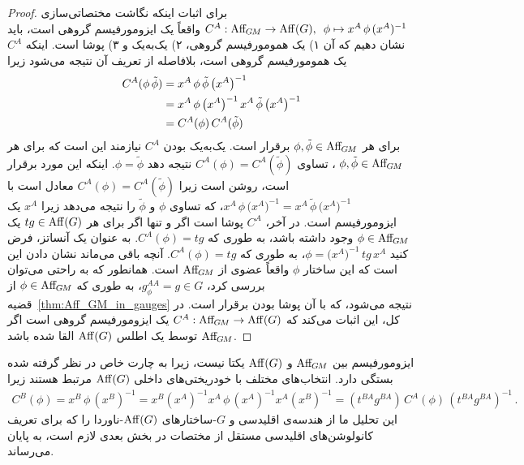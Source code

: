 \begin{proof}
	برای اثبات اینکه نگاشت مختصاتی‌سازی $C^A: \operatorname{Aff}_{\mkern-2muG\mkern-1.4muM} \to \operatorname{Aff}(G),\,\ \phi \mapsto x^A \,\phi\, (x^A)^{-1}$ واقعاً یک ایزومورفیسم گروهی است، باید نشان دهیم که آن
	۱) یک همومورفیسم گروهی،
	۲) یک‌به‌یک و
	۳) پوشا است.
	اینکه $C^A$ یک همومورفیسم گروهی است، بلافاصله از تعریف آن نتیجه می‌شود زیرا
	\begin{align}
		C^A(\phi\, \tilde{\phi})
		&= x^A\, \phi\, \tilde{\phi}\, \big(x^A\big)^{-1} \notag \\
		&= x^A\, \phi\, \big(x^A\big)^{-1}\, x^A\, \tilde{\phi}\, \big(x^A\big)^{-1} \\
		&= C^A(\phi)\, C^A(\tilde{\phi}) \notag
	\end{align}
	برای هر $\phi,\tilde{\phi} \in \operatorname{Aff}_{\mkern-2muG\mkern-1.4muM}$ برقرار است.
	یک‌به‌یک بودن $C^A$ نیازمند این است که برای هر $\phi,\tilde{\phi} \in \operatorname{Aff}_{\mkern-2muG\mkern-1.4muM}$ ، تساوی $C^A(\phi) = C^A(\tilde{\phi})$ نتیجه دهد $\phi = \tilde{\phi}$.
	اینکه این مورد برقرار است، روشن است زیرا $C^A(\phi) = C^A(\tilde{\phi})$ معادل است با
	$x^A\, \phi\, \big(x^A\big)^{-1} = x^A\, \tilde{\phi}\, \big(x^A\big)^{-1}$، که تساوی $\phi$ و $\tilde{\phi}$ را نتیجه می‌دهد زیرا $x^A$ یک ایزومورفیسم است.
	در آخر، $C^A$ پوشا است اگر و تنها اگر برای هر $tg \in \operatorname{Aff}(G)$ یک $\phi \in \operatorname{Aff}_{\mkern-2muG\mkern-1.4muM}$ وجود داشته باشد، به طوری که $C^A(\phi) = tg$.
	به عنوان یک آنساتز، فرض کنید $\phi = \big(x^A\big)^{-1} \,tg\, x^A$، به طوری که $C^A(\phi) = tg$.
	آنچه باقی می‌ماند نشان دادن این است که این ساختار $\phi$ واقعاً عضوی از $\operatorname{Aff}_{\mkern-2muG\mkern-1.4muM}$ است.
	همانطور که به راحتی می‌توان بررسی کرد، $g_\phi^{AA} = g \in G$، به طوری که $\phi \in \operatorname{Aff}_{\mkern-2muG\mkern-1.4muM}$ از قضیه~\ref{thm:Aff_GM_in_gauges} نتیجه می‌شود، که با آن پوشا بودن برقرار است.
	در کل، این اثبات می‌کند که $C^A: \operatorname{Aff}_{\mkern-2muG\mkern-1.4muM} \to \operatorname{Aff}(G)$ یک ایزومورفیسم گروهی است اگر $\operatorname{Aff}_{\mkern-2muG\mkern-1.4muM}$ توسط یک اطلس $\operatorname{Aff}(G)$ القا شده باشد.
\end{proof}

ایزومورفیسم بین $\operatorname{Aff}_{\mkern-2muG\mkern-1.4muM}$ و $\operatorname{Aff}(G)$ یکتا نیست، زیرا به چارت خاص در نظر گرفته شده بستگی دارد.
انتخاب‌های مختلف با خودریختی‌های داخلی $\operatorname{Aff}(G)$ مرتبط هستند زیرا
\begin{align}
	C^B(\phi) 
	= x^B \,\phi\, (x^B)^{-1}
	= x^B (x^A)^{-1} x^A \,\phi\, (x^A)^{-1} x^A (x^B)^{-1}
	= (t^{BA} g^{BA}) \,C^A(\phi)\, (t^{BA} g^{BA})^{-1}
	\,.
\end{align}
این تحلیل ما از هندسه‌ی اقلیدسی و $G$-ساختارهای $\operatorname{Aff}(G)$-ناوردا را که برای تعریف کانولوشن‌های اقلیدسی مستقل از مختصات در بخش بعدی لازم است، به پایان می‌رساند.